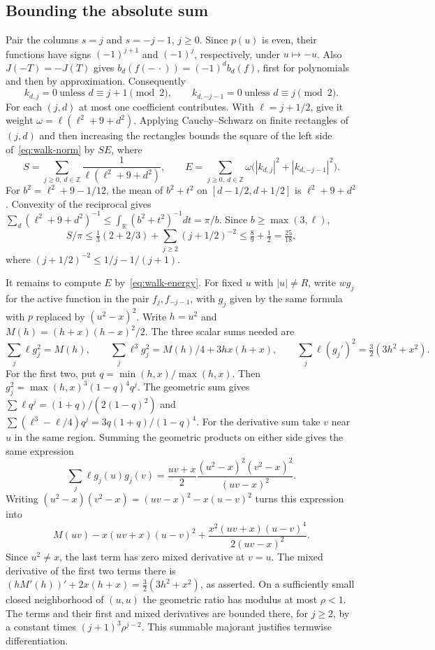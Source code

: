 \documentclass[11pt,reqno]{amsart}
\numberwithin{equation}{section}
\newcommand{\Z}{\mathbb Z}
\begin{document}
\subsection{Bounding the absolute sum}
Pair the columns $s=j$ and $s=-j-1$, $j\ge0$. Since $p(u)$ is even, their functions have signs $(-1)^{j+1}$ and $(-1)^j$, respectively, under $u\mapsto -u$. Also $J(-T)=-J(T)$ gives $b_d(f(-\,\cdot))=(-1)^d b_d(f)$, first for polynomials and then by approximation. Consequently
\[
 k_{d,j}=0\ \text{unless }d\equiv j+1\pmod 2,\qquad
 k_{d,-j-1}=0\ \text{unless }d\equiv j\pmod 2 .
\]
For each $(j,d)$ at most one coefficient contributes. With $\ell=j+1/2$, give it weight $\omega=\ell(\ell^2+9+d^2)$. Applying Cauchy--Schwarz on finite rectangles of $(j,d)$ and then increasing the rectangles bounds the square of the left side of~\eqref{eq:walk-norm} by $SE$, where
\[
 S=\sum_{j\ge0,\ d\in\Z}\frac1{\ell(\ell^2+9+d^2)},\qquad
 E=\sum_{j\ge0,\ d\in\Z}\omega\bigl(|k_{d,j}|^2+|k_{d,-j-1}|^2\bigr).
\]
For $b^2=\ell^2+9-1/12$, the mean of $b^2+t^2$ on $[d-1/2,d+1/2]$ is $\ell^2+9+d^2$. Convexity of the reciprocal gives $\sum_d(\ell^2+9+d^2)^{-1}\le\int_{\mathbb R}(b^2+t^2)^{-1}dt=\pi/b$. Since $b\ge\max(3,\ell)$,
\[
 S/\pi\le \tfrac13(2+2/3)+\sum_{j\ge2}(j+1/2)^{-2}
 \le\tfrac89+\tfrac12=\tfrac{25}{18},
\]
where $(j+1/2)^{-2}\le 1/j-1/(j+1)$.

It remains to compute $E$ by~\eqref{eq:walk-energy}. For fixed $u$ with $|u|\ne R$, write $w g_j$ for the active function in the pair $f_j,f_{-j-1}$, with $g_j$ given by the same formula with $p$ replaced by $(u^2-x)^2$. Write $h=u^2$ and $M(h)=(h+x)(h-x)^2/2$. The three scalar sums needed are
\begin{equation}\label{eq:walk-sums}
 \sum_j\ell g_j^2=M(h),\qquad
 \sum_j\ell^3 g_j^2=M(h)/4+3hx(h+x),\qquad
 \sum_j\ell (g_j')^2=\tfrac32(3h^2+x^2).
\end{equation}
For the first two, put $q=\min(h,x)/\max(h,x)$. Then $g_j^2=\max(h,x)^3(1-q)^4q^j$. The geometric sum gives $\sum\ell q^j=(1+q)/(2(1-q)^2)$ and $\sum(\ell^3-\ell/4)q^j=3q(1+q)/(1-q)^4$. For the derivative sum take $v$ near $u$ in the same region. Summing the geometric products on either side gives the same expression
\[
 \sum_j\ell g_j(u)g_j(v)=
 \frac{uv+x}{2}\frac{(u^2-x)^2(v^2-x)^2}{(uv-x)^2}.
\]
Writing $(u^2-x)(v^2-x)=(uv-x)^2-x(u-v)^2$ turns this expression into
\[
 M(uv)-x(uv+x)(u-v)^2+
 \frac{x^2(uv+x)(u-v)^4}{2(uv-x)^2}.
\]
Since $u^2\ne x$, the last term has zero mixed derivative at $v=u$. The mixed derivative of the first two terms there is $(hM'(h))'+2x(h+x)=\tfrac32(3h^2+x^2)$, as asserted. On a sufficiently small closed neighborhood of $(u,u)$ the geometric ratio has modulus at most $\rho<1$. The terms and their first and mixed derivatives are bounded there, for $j\ge2$, by a constant times $(j+1)^3\rho^{j-2}$. This summable majorant justifies termwise differentiation.
\end{document}

